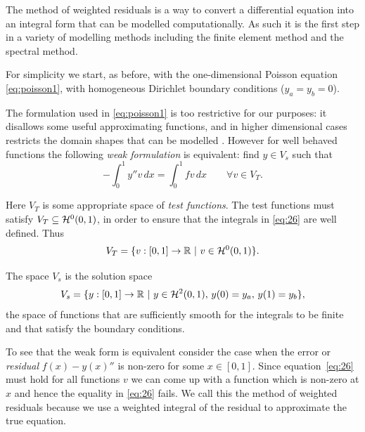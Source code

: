 The method of weighted residuals is a way to convert a differential equation
into an integral form that can be modelled computationally. As such it is the
first step in a variety of modelling methods including the finite element method
and the spectral method.

For simplicity we start, as before, with the one-dimensional Poisson equation
\eqref{eq:poisson1}, with homogeneous Dirichlet boundary conditions
(\ie $y_{a}=y_{b}=0$).


The formulation used in \eqref{eq:poisson1} is too restrictive for our purposes:
it disallows some useful approximating functions, and in higher dimensional
cases restricts the domain shapes that can be modelled
\cite{HowardElmanDavidSilvester2006}. However for well behaved functions the
following \emph{weak formulation} is equivalent: find $y\in V_{s}$ such that
\begin{equation}
  -\int_{0}^{1}y''v\, dx=\int_{0}^{1}fv\, dx \qquad \forall v\in V_{T}.
  \label{eq:26}
\end{equation}

Here $V_{T}$ is some appropriate space of \emph{test functions}. The test
functions must satisfy $V_{T}\subseteq \mathcal{H}^0(0,1)$, in order to ensure that the integrals in \eqref{eq:26} are well defined. Thus
\begin{equation}
  \label{eq:28}
  V_{T}=\{v:[0,1]\rightarrow\mathbb{R}\, \,|\, \, v \in \mathcal{H}^0(0,1)\}.
\end{equation}

The space $V_{s}$ is the solution space
\begin{equation*}
  V_{s}=\{y:[0,1]\rightarrow\mathbb{R}\, \,|\, \, y \in \mathcal{H}^2(0,1),\,
  y(0) = y_{a},\, y(1) = y_{b}\},
\end{equation*}
 \ie the space of functions that are sufficiently smooth for the integrals to be finite and that satisfy the boundary conditions.

To see that the weak form is equivalent consider the case when the error or \emph{residual} $f(x) -y(x)''$ is non-zero for some $x \in [0,1]$. Since equation~\eqref{eq:26} must hold for all functions $v$ we can come up with a function which is non-zero at $x$ and hence the equality in \eqref{eq:26} fails. We call this the method of weighted residuals because we use a weighted integral of the residual to approximate the true equation.\cite{Zeinkiewicz1967}%

